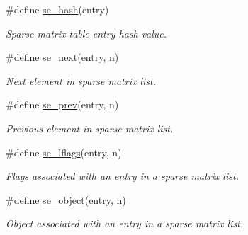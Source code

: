 \begin{CompactItemize}
\#define \hyperlink{group__dbprim__smat_a42}{se\_\-hash}(entry)
\begin{CompactList}\small\item\em Sparse matrix table entry hash value.\item\end{CompactList}\item 
\#define \hyperlink{group__dbprim__smat_a43}{se\_\-next}(entry, n)
\begin{CompactList}\small\item\em Next element in sparse matrix list.\item\end{CompactList}\item 
\#define \hyperlink{group__dbprim__smat_a44}{se\_\-prev}(entry, n)
\begin{CompactList}\small\item\em Previous element in sparse matrix list.\item\end{CompactList}\item 
\#define \hyperlink{group__dbprim__smat_a45}{se\_\-lflags}(entry, n)
\begin{CompactList}\small\item\em Flags associated with an entry in a sparse matrix list.\item\end{CompactList}\item 
\#define \hyperlink{group__dbprim__smat_a46}{se\_\-object}(entry, n)
\begin{CompactList}\small\item\em Object associated with an entry in a sparse matrix list.\item\end{CompactList}\end{CompactItemize}
